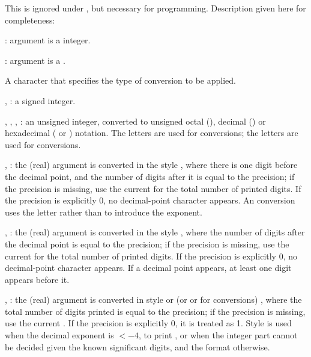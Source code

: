 { This is ignored under , but
necessary for  programming. Description given here for
completeness:

\item {}: argument is a  integer.

\item {}: argument is a .

 A character that specifies the type of
conversion to be applied.

\item {}, : a signed integer.

\item {}, , , : an unsigned integer, converted
to unsigned octal (), decimal () or hexadecimal ( or
) notation. The letters  are used for 
conversions;  the letters  are used for  conversions.

\item {}, : the (real) argument is converted in the style
, where there is one digit before the decimal point,
and the number of digits after it is equal to the precision; if the
precision is missing, use the current  for the total
number of printed digits. If the precision is explicitly 0, no decimal-point
character appears. An  conversion uses the letter  rather
than  to introduce the exponent.

\item {}, : the (real) argument is converted in the style
, where the number of digits after the decimal point
is equal to the precision; if the precision is missing, use the current
 for the total number of printed digits. If the precision
is explicitly 0, no decimal-point character appears. If a decimal point
appears, at least one digit appears before it.

\item {}, : the (real) argument is converted in style
 or  (or  or  for  conversions)
, where the total number of digits printed
is equal to the precision; if the precision is missing, use the current
. If the precision is explicitly 0, it is treated as 1.
Style  is used when
the decimal exponent is $< -4$, to print , or when the integer
part cannot be decided given the known significant digits, and the 
format otherwise.

}
